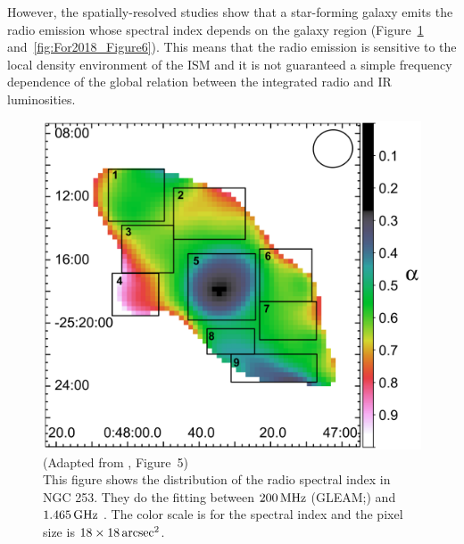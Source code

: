 However, the spatially-resolved studies show that a star-forming galaxy emits the radio emission whose spectral index depends on the galaxy region \citep{Kapinska2017a, For2018a, Heesen2019} (Figure~\ref{fig:Kapinska2017_Figure5} and~\ref{fig:For2018_Figure6}).
This means that the radio emission is sensitive to the local density environment of the ISM and it is not guaranteed a simple frequency dependence of the global relation between the integrated radio and IR luminosities.

\begin{figure}[htbp]
	\centering
	\includegraphics[width=.6\linewidth]{Chapter_1/Figures/Kapinska2017_Figure5.png}
    \caption[Adaptedfrom \citet{Kapinska2017a} (Figure~5)]{\label{fig:Kapinska2017_Figure5}
        (Adapted from \citet{Kapinska2017a}, Figure~5)\\
        This figure shows the distribution of the radio spectral index in NGC 253.
        They do the fitting between $200\,\mathrm{MHz}$ (GLEAM;\@\citealt{Hurley-Walker2017a}) and $1.465\,\mathrm{GHz}$ \citep{Carilli1992}.
        The color scale is for the spectral index and the pixel size is $18 \times 18 \,\mathrm{arcsec}^2$.
    }
\end{figure}

